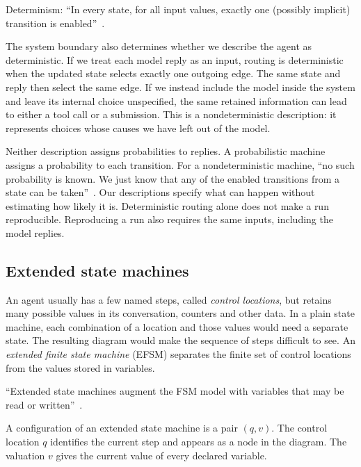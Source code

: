 \begin{definition}[Determinism]
\label{def:determinism}
Determinism: ``In every state, for all input values, exactly one (possibly implicit) transition is
enabled''~\citep[slide~29]{seshia2015discrete}.
\end{definition}

The system boundary also determines whether we describe the agent as deterministic. If we treat
each model reply as an input, routing is deterministic when the updated state selects exactly
one outgoing edge. The same state and reply then select the same edge. If we instead include
the model inside the system and leave its internal choice unspecified, the same retained
information can lead to either a tool call or a submission. This is a nondeterministic
description: it represents choices whose causes we have left out of the model.

Neither description assigns probabilities to replies. A probabilistic machine assigns a probability to
each transition. For a nondeterministic machine, ``no such probability is known. We just know that
any of the enabled transitions from a state can be taken''~\citep[slides~33 and~37]{seshia2015discrete}.
Our descriptions specify what can happen without estimating how likely it is.
Deterministic routing alone does not make a run reproducible. Reproducing a run also requires the
same inputs, including the model replies.

\subsection{Extended state machines}
\label{sec:efsm-extended}

An agent usually has a few named steps, called \emph{control locations}, but retains many possible
values in its conversation, counters and other data. In a plain state machine, each combination
of a location and those values would need a separate state. The resulting diagram would make
the sequence of steps difficult to see. An \emph{extended finite state machine} (EFSM) separates
the finite set of control locations from the values stored in variables.

\begin{definition}
\label{def:efsm}
``Extended state machines augment the FSM model with variables that may be read or
written''~\citep[slide~4]{seshia2015extended}.
\end{definition}

\begin{definition}[Configuration]
\label{def:configuration}
A configuration of an extended state machine is a pair $(q, v)$. The control location $q$ identifies
the current step and appears as a node in the diagram. The valuation $v$ gives the current value
of every declared variable.
\end{definition}

